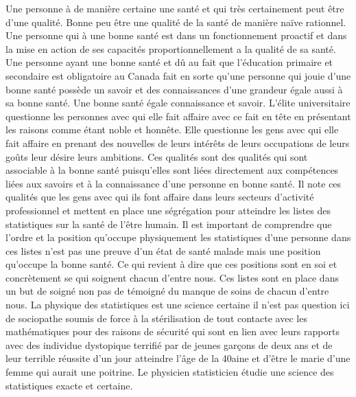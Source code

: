 \documentclass[12pt,a4paper]{article}
\begin{document}
Une personne à de manière certaine une santé et qui très certainement peut être d’une qualité. Bonne peu être une qualité de la santé de manière naïve rationnel. Une personne qui à une bonne santé est dans un fonctionnement proactif et dans la mise en action de ses capacités proportionnellement a la qualité de sa santé. Une personne ayant une bonne santé et dû au fait que l’éducation primaire et secondaire est obligatoire au Canada fait en sorte qu’une personne qui jouie d’une bonne santé possède un savoir et des connaissances d’une grandeur égale aussi à sa bonne santé. Une bonne santé égale connaissance et savoir. L’élite universitaire questionne les personnes avec qui elle fait affaire avec ce fait en tête en présentant les raisons comme étant noble et honnête. Elle questionne les gens avec qui elle fait affaire en prenant des nouvelles de leurs intérêts de leurs occupations de leurs goûts leur désire leurs ambitions. Ces qualités sont des qualités qui sont associable à la bonne santé puisqu’elles sont liées directement aux compétences liées aux savoirs et à la connaissance d’une personne en bonne santé.
Il note ces qualités que les gens avec qui ils font affaire dans leurs secteurs d’activité professionnel et mettent en place une ségrégation pour atteindre les listes des statistiques sur la santé de l’être humain. Il est important de comprendre que l’ordre et la position qu’occupe physiquement les statistiques d’une personne dans ces listes n’est pas une preuve d’un état de santé malade mais une position qu’occupe la bonne santé. Ce qui revient à dire que ces positions sont en soi et concrètement se qui soignent chacun d’entre nous. Ces listes sont en place dans un but de soigné non pas de témoigné du manque de soins de chacun d’entre nous. La physique des statistiques est une science certaine il n’est pas question ici de sociopathe soumis de force à la stérilisation de tout contacte avec les mathématiques pour des raisons de sécurité qui sont en lien avec leurs rapports avec des individue dystopique terrifié par de jeunes garçons de deux ans et de leur terrible réussite d’un jour atteindre l’âge de la 40aine et d’être le marie d’une femme qui aurait une poitrine. Le physicien statisticien étudie une science des statistiques exacte et certaine.
\end{document}
